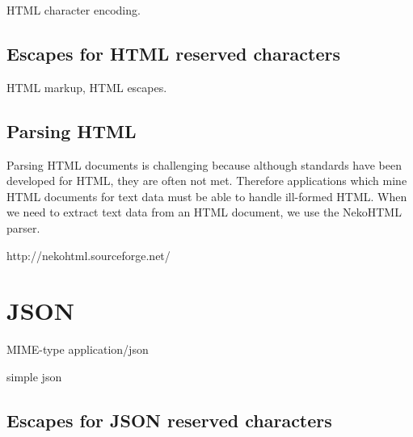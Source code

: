 HTML character encoding.

\subsection{Escapes for HTML reserved characters}

HTML markup, HTML escapes.

\subsection{Parsing HTML}

Parsing HTML documents is challenging because although standards
have been developed for HTML, they are often not met.
Therefore applications which mine HTML documents for text data
must be able to handle ill-formed HTML.
When we need to extract text data from an HTML document,
we use the NekoHTML parser.

http://nekohtml.sourceforge.net/


\section{JSON}

MIME-type application/json

simple json

\subsection{Escapes for JSON reserved characters}

